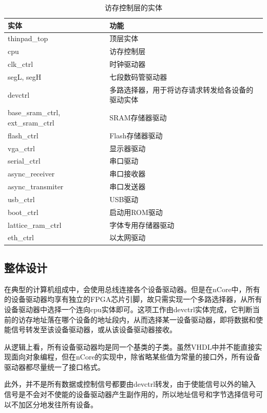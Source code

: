 \documentclass{article}
\begin{document}
\begin{spacing}{1.4}
\begin{table}[!htb]
\begin{center}
\begin{tabular*}{15cm}{l|l}
\hline
\textbf{实体}&\textbf{功能} \\
\hline thinpad\_top & 顶层实体 \\
\hline cpu & 访存控制层 \\
\hline clk\_ctrl & 时钟驱动器 \\
\hline segL, segH & 七段数码管驱动器 \\
\hline devctrl & 多路选择器，用于将访存请求转发给各设备的驱动实体 \\
\hline base\_sram\_ctrl, ext\_sram\_ctrl & SRAM存储器驱动 \\
\hline flash\_ctrl & Flash存储器驱动 \\
\hline vga\_ctrl & 显示器驱动 \\
\hline serial\_ctrl & 串口驱动 \\
\hline async\_receiver & 串口接收器 \\
\hline async\_transmiter & 串口发送器 \\
\hline usb\_ctrl & USB驱动 \\
\hline boot\_ctrl & 启动用ROM驱动 \\
\hline lattice\_ram\_ctrl & 字体专用存储器驱动 \\
\hline eth\_ctrl & 以太网驱动 \\
\hline
\end{tabular*}
\caption{访存控制层的实体}
\label{tb:io-entities}
\end{center}
\end{table}

\subsection{整体设计}

在典型的计算机组成中，会使用总线连接各个设备驱动器。但是在nCore中，所有的设备驱动器均享有独立的FPGA芯片引脚，故只需实现一个多路选择器，从所有设备驱动器中选择一个连向cpu实体即可。这项工作由devctrl实体完成，它判断当前的访存地址落在哪个设备的地址段内，从而选择某一设备驱动器，即将数据和使能信号转发至该设备驱动器，或从该设备驱动器接收。

从逻辑上看，所有设备驱动器均是同一个基类的子类。虽然VHDL中并不能直接实现面向对象编程，但在nCore的实现中，除省略某些值为常量的接口外，所有设备驱动器都尽量统一了接口格式。

此外，并不是所有数据或控制信号都要由devctrl转发，由于使能信号以外的输入信号是不会对不使能的设备驱动器产生副作用的，所以地址信号和字节选择信号可以不加区分地发往所有设备。


\end{spacing}
\end{document}
